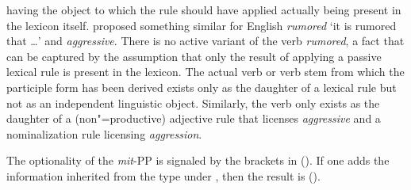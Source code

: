 \begin{exe}
\begin{xlist}[iv.]
\begin{exe}
\begin{xlist}[iv.]
having the object to which the rule should have applied actually being present in the lexicon itself. 
\citet[Section~3.4.2, 5.3]{Koenig99a} proposed something similar for English \emph{rumored} `it is rumored that \ldots' and \emph{aggressive}. 
There is no active variant of the verb \emph{rumored}, a fact that can be captured by the assumption that only the result of applying a passive lexical rule
is present in the lexicon. The actual verb or verb stem from which the participle form has been
derived exists only as the daughter of a lexical rule but not as an independent linguistic
object. Similarly, the verb  only exists as the daughter of a (non"=productive)
adjective rule that licenses \emph{aggressive} and a nominalization rule licensing \emph{aggression}.

The optionality of the \emph{mit}-PP is signaled by the brackets in (). If one adds the information inherited from the type 
under \synsem, then the result is ().
\ea
\label{in-den-muell-lexical}
\end{xlist}
\end{exe}
\end{xlist}
\end{exe}
